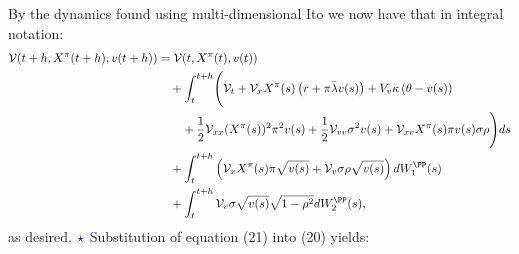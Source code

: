 \documentclass[11pt]{article}
\numberwithin{equation}{section}
\begin{document}
By the dynamics found using multi-dimensional Ito we now have that in integral
notation:
\begin{align*}
    \mathcal{V}(t + h, X^\pi(t + h), v(t + h)) &= \mathcal{V}(t, X^\pi(t), v(t)) \\
&\quad+ \int_{t}^{t+h} \Biggl( \mathcal{V}_t + \mathcal{V}_x X^\pi(s) \left( r + \pi \bar{\lambda} v(s) \right) + V_v \kappa \left( \theta - v(s) \right) \\
&\quad \quad + \frac{1}{2} \mathcal{V}_{xx} (X^\pi(s))^2 \pi^2 v(s) + \frac{1}{2} \mathcal{V}_{vv} \sigma^2 v(s) + \mathcal{V}_{xv} X^\pi(s) \pi v(s) \sigma \rho \Biggr) ds \\
&\quad+ \int_{t}^{t+h} \left( \mathcal{V}_x X^\pi(s) \pi \sqrt{v(s)} + \mathcal{V}_v \sigma \rho \sqrt{v(s)} \right) dW^\PP_1(s) \\
&\quad+ \int_{t}^{t+h} \mathcal{V}_v \sigma \sqrt{v(s)} \sqrt{1 - \rho^2} dW^\PP_2(s),
\end{align*}
as desired.
\newpage
$\textcolor{blue}{\star}$ Substitution of equation
(21) into (20) yields:
\end{document}

